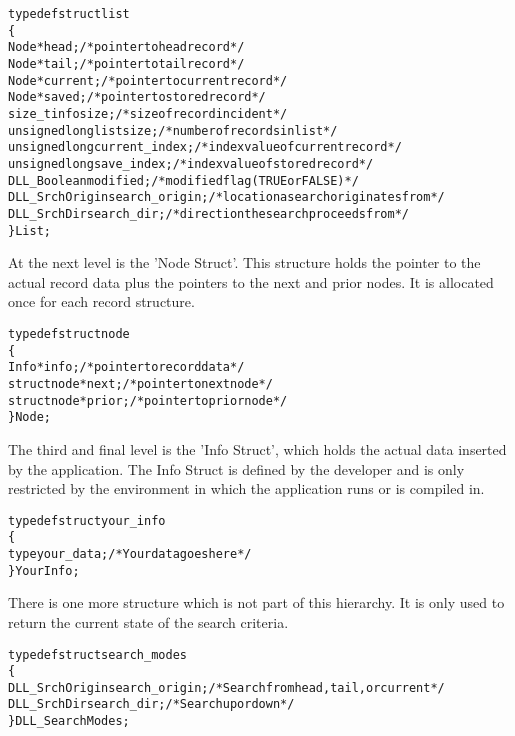 \documentclass[10pt,letterpaper,titlepage]{article}
\begin{document}
\small
\begin{alltt}
typedef struct list
   \{
   Node           *head;         /* pointer to head record */
   Node           *tail;         /* pointer to tail record */
   Node           *current;      /* pointer to current record */
   Node           *saved;        /* pointer to stored record */
   size_t         infosize;      /* size of record incident */
   unsigned long  listsize;      /* number of records in list */
   unsigned long  current_index; /* index value of current record */
   unsigned long  save_index;    /* index value of stored record */
   DLL_Boolean    modified;      /* modified flag (TRUE or FALSE) */
   DLL_SrchOrigin search_origin; /* location a search originates from */
   DLL_SrchDir    search_dir;    /* direction the search proceeds from */
   \} List;
\end{alltt}
\normalsize
\vspace{8pt}

\noindent
At the next level is the 'Node Struct'.  This structure holds the pointer to the actual record data plus the pointers to the next and prior nodes.  It is allocated once for each record structure.

\small
\begin{alltt}
typedef struct node
   \{
   Info        *info;     /* pointer to record data */
   struct node *next;     /* pointer to next node */
   struct node *prior;    /* pointer to prior node */
   \} Node;
\end{alltt}
\normalsize
\vspace{8pt}

\noindent
The third and final level is the 'Info Struct', which holds the actual data inserted by the application.  The Info Struct is defined by the developer and is only restricted by the environment in which the application runs or is compiled in.

\small
\begin{alltt}
typedef struct your_info
   \{
   type your_data;        /* Your data goes here */
   \} YourInfo;
\end{alltt}
\normalsize
\vspace{8pt}

\noindent
There is one more structure which is not part of this hierarchy.  It is only used to return the current state of the search criteria.

\small
\begin{alltt}
typedef struct search_modes
   \{
   DLL_SrchOrigin search_origin; /* Search from head, tail, or current */
   DLL_SrchDir    search_dir;    /* Search up or down */
   \} DLL_SearchModes;
\end{alltt}
\normalsize
\pagebreak
\end{document}
